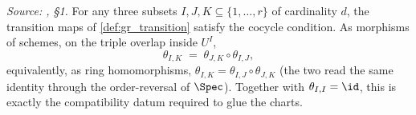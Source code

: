 \begin{lemma}\leanok
  \label{lem:gr_cocycle}
  \textit{Source: \cite{nitsure-hilbert-quot}, \S 1.}
  For any three subsets \(I, J, K \subseteq \{1, \dots, r\}\) of cardinality
  \(d\), the transition maps of \cref{def:gr_transition} satisfy the cocycle
  condition. As morphisms of schemes, on the triple overlap inside \(U^I\),
  \[
    \theta_{I,K} \;=\; \theta_{J,K} \circ \theta_{I,J},
  \]
  equivalently, as ring homomorphisms,
  \(\theta_{I,K} = \theta_{I,J} \circ \theta_{J,K}\) (the two read the same
  identity through the order-reversal of \(\Spec\)). Together with
  \(\theta_{I,I} = \id\), this is exactly the compatibility datum required to
  glue the charts.
\end{lemma}

